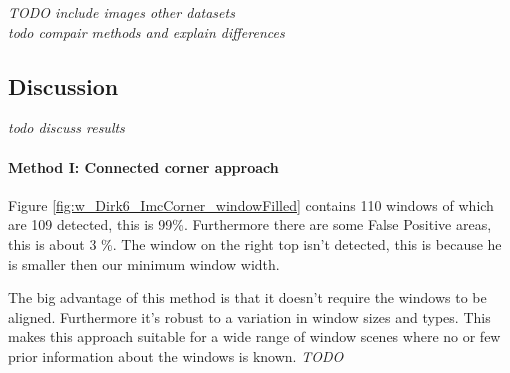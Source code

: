 






\emph{TODO include images other datasets} \\
\emph{todo compair methods and explain differences}


\subsection{Discussion}  %
\emph{ todo discuss results }

\paragraph{Method I: Connected corner approach} 
Figure \ref{fig:w_Dirk6_ImcCorner_windowFilled} contains 110 windows of which
are 109 detected, this is 99\%. Furthermore there are some False Positive areas,
this is about 3 \%.  The window on the right top isn't detected, this is because
he is smaller then our minimum window width.


The big advantage of this method is that it doesn't require the windows to be aligned.
Furthermore it's robust to a variation in window sizes and types. This makes
this approach suitable for a wide range of window scenes where no or few prior
information about the windows is known.
\emph{TODO}


